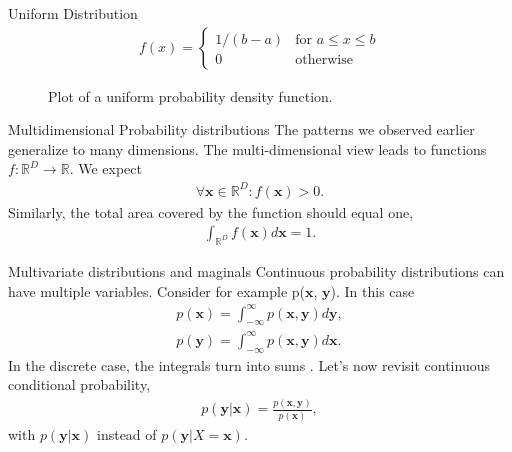 \documentclass{beamer}
\begin{document}
    \begin{frame}{Uniform Distribution}
      \begin{align}
        f(x) = \begin{cases}
        1/(b-a)   &    \text{for } a \leq x \leq b \\
        0         &    \text{otherwise}  
        \end{cases}
      \end{align}
      \begin{figure}
      
      \caption{Plot of a uniform probability density function.}
      \end{figure}
    \end{frame}

    \begin{frame}{Multidimensional Probability distributions \cite{deisenroth2020mathematics}}
      The patterns we observed earlier generalize to many dimensions.
      The multi-dimensional view leads to functions $f: \mathbb{R}^D \rightarrow \mathbb{R}$.
      We expect
      \begin{align}
        \forall \mathbf{x} \in \mathbb{R}^D : f(\mathbf{x}) > 0.
      \end{align}
      Similarly, the total area covered by the function should equal one,
      \begin{align}
        \int_{\mathbb{R}^D} f(\mathbf{x}) d\mathbf{x} = 1.
      \end{align}
    
    \end{frame}

    \begin{frame}{Multivariate distributions and maginals}
      Continuous probability distributions can have multiple variables.
      Consider for example p($\mathbf{x}$, $\mathbf{y}$).
      In this case 
      \begin{align}
        p(\mathbf{x}) = \int_{-\infty}^{\infty} p(\mathbf{x}, \mathbf{y}) d\mathbf{y}, \\
        p(\mathbf{y}) = \int_{-\infty}^{\infty} p(\mathbf{x}, \mathbf{y}) d\mathbf{x}.
      \end{align}
      In the discrete case, the integrals turn into sums \cite{deisenroth2020mathematics}.
      Let's now revisit continuous conditional probability,
      \begin{align}
        p(\mathbf{y}|\mathbf{x}) = \frac{p(\mathbf{x}, \mathbf{y})}{p(\mathbf{x})},
      \end{align}
      with $p(\mathbf{y}|\mathbf{x})$ instead of $p(\mathbf{y}|X = \mathbf{x})$.
    \end{frame}
\end{document}
